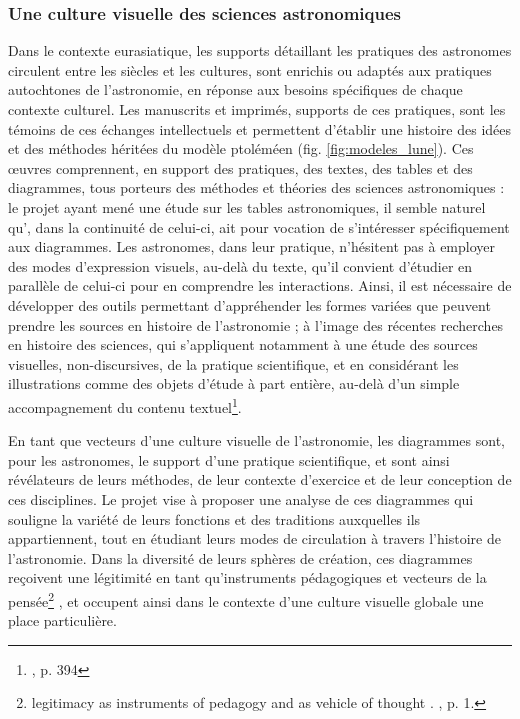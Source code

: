         \subsubsection{Une culture visuelle des sciences astronomiques}
Dans le contexte eurasiatique, les supports détaillant les pratiques des astronomes circulent entre les siècles et les cultures, sont enrichis ou adaptés aux pratiques autochtones de l'astronomie, en réponse aux besoins spécifiques de chaque contexte culturel. Les manuscrits et imprimés, supports de ces pratiques, sont les témoins de ces échanges intellectuels et permettent d'établir une histoire des idées et des méthodes héritées du modèle ptoléméen (fig. \ref{fig:modeles_lune}). Ces œuvres comprennent, en support des pratiques, des textes, des tables et des diagrammes, tous porteurs des méthodes et théories des sciences astronomiques : le projet \dishas ayant mené une étude sur les tables astronomiques, il semble naturel qu'\eida, dans la continuité de celui-ci, ait pour vocation de s'intéresser spécifiquement aux diagrammes. Les astronomes, dans leur pratique, n'hésitent pas à employer des modes d'expression visuels, au-delà du texte, qu'il convient d'étudier en parallèle de celui-ci pour en comprendre les interactions. Ainsi, il est nécessaire de développer des outils permettant d'appréhender les formes variées que peuvent prendre les sources en histoire de l'astronomie ; à l'image des récentes recherches en histoire des sciences, qui s'appliquent notamment à une étude des sources visuelles, non-discursives, de la pratique scientifique, et en considérant les illustrations comme des objets d'étude à part entière, au-delà d'un simple accompagnement du contenu textuel\footnote{\cite{jardineCriticalEditingEarlyModern2010}, p. 394}.

En tant que vecteurs d'une culture visuelle de l'astronomie, les diagrammes sont, pour les astronomes, le support d'une pratique scientifique, et sont ainsi révélateurs de leurs méthodes, de leur contexte d'exercice et de leur conception de ces disciplines. Le projet vise à proposer une analyse de ces diagrammes qui souligne la variété de leurs fonctions et des traditions auxquelles ils appartiennent, tout en étudiant leurs modes de circulation à travers l'histoire de l'astronomie. Dans la diversité de leurs sphères de création, ces diagrammes reçoivent \og une légitimité en tant qu'instruments pédagogiques et vecteurs de la pensée\footnote{\og [...] legitimacy as instruments of pedagogy and as vehicle of thought \fg. \cite{hamburgerDiagramParadigmCrossCultural2022}, p. 1.}  \fg, et occupent ainsi dans le contexte d'une culture visuelle globale une place particulière.

